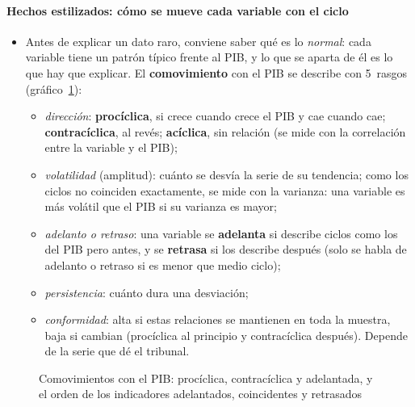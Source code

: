 \documentclass[11pt]{article}
\begin{document}
\paragraph{Hechos estilizados: cómo se mueve cada variable con el ciclo}
\begin{itemize}
\item Antes de explicar un dato raro, conviene saber qué es lo \emph{normal}: cada variable tiene un patrón típico frente al PIB, y lo que se aparta de él es lo que hay que explicar. El \textbf{comovimiento} con el PIB se describe con 5~rasgos (gráfico~\ref{fig:comovimientos}):
  \begin{itemize}
  \item \emph{dirección}: \textbf{procíclica}, si crece cuando crece el PIB y cae cuando cae; \textbf{contracíclica}, al revés; \textbf{acíclica}, sin relación (se mide con la correlación entre la variable y el PIB);
  \item \emph{volatilidad} (amplitud): cuánto se desvía la serie de su tendencia; como los ciclos no coinciden exactamente, se mide con la varianza: una variable es más volátil que el PIB si su varianza es mayor;
  \item \emph{adelanto o retraso}: una variable se \textbf{adelanta} si describe ciclos como los del PIB pero antes, y se \textbf{retrasa} si los describe después (solo se habla de adelanto o retraso si es menor que medio ciclo);
  \item \emph{persistencia}: cuánto dura una desviación;
  \item \emph{conformidad}: alta si estas relaciones se mantienen en toda la muestra, baja si cambian (procíclica al principio y contracíclica después). Depende de la serie que dé el tribunal.
  \end{itemize}
\end{itemize}

\begin{figure}[!htb]
\centering
\caption{Comovimientos con el PIB: procíclica, contracíclica y adelantada, y el orden de los indicadores adelantados, coincidentes y retrasados}\label{fig:comovimientos}
\end{figure}
\end{document}
